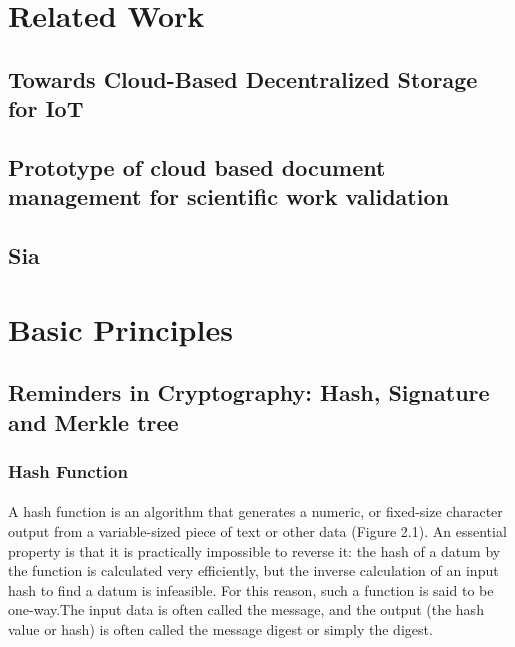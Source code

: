 \section{Related Work}


\subsection{Towards Cloud-Based Decentralized Storage for IoT}
\subsection{Prototype of cloud based document management for scientific work validation}
\subsection{Sia}

\section{Basic Principles}

\subsection{Reminders in Cryptography: Hash, Signature and Merkle tree}
\subsubsection{Hash Function}
\paragraph{}
A hash function is an algorithm that generates a numeric, or fixed-size character output from a variable-sized piece of text or other data (Figure 2.1). An essential property is that it is practically impossible to reverse it: the hash of a datum by the function is calculated very efficiently, but the inverse calculation of an input hash to find a datum is infeasible. For this reason, such a function is said to be one-way.The input data is often called the message, and the output (the hash value or hash) is often called the message digest or simply the digest.

